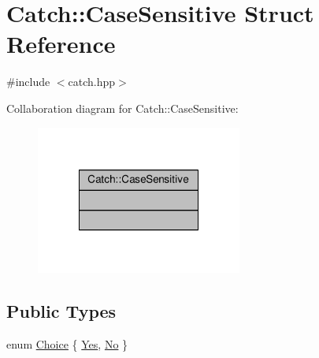 \hypertarget{struct_catch_1_1_case_sensitive}{\section{Catch\-:\-:Case\-Sensitive Struct Reference}
\label{struct_catch_1_1_case_sensitive}
}


{\ttfamily \#include $<$catch.\-hpp$>$}



Collaboration diagram for Catch\-:\-:Case\-Sensitive\-:
\nopagebreak
\begin{figure}[H]
\begin{center}
\leavevmode
\includegraphics[width=192pt]{struct_catch_1_1_case_sensitive__coll__graph}
\end{center}
\end{figure}
\subsection*{Public Types}
\begin{DoxyCompactItemize}
\item 
enum \hyperlink{struct_catch_1_1_case_sensitive_aad49d3aee2d97066642fffa919685c6a}{Choice} \{ \hyperlink{struct_catch_1_1_case_sensitive_aad49d3aee2d97066642fffa919685c6aa7c5550b69ec3c502e6f609b67f9613c6}{Yes}, 
\hyperlink{struct_catch_1_1_case_sensitive_aad49d3aee2d97066642fffa919685c6aa4ffff8d29b481f0116abc37228cd53f6}{No}
 \}
\end{DoxyCompactItemize}


